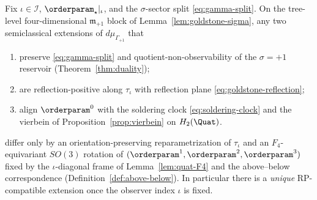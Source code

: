\begin{lemma}
\label{lem:goldstone-rp-unique}
Fix $\iota\in\mathcal{I}$, $\orderparam_\star|_\iota$, and the
$\sigma$-sector split \eqref{eq:gamma-split}. On the tree-level
four-dimensional $\mathfrak{m}_{+1}$ block of
Lemma~\ref{lem:goldstone-sigma}, any two semiclassical extensions of
$d\mu_{\Gamma_{+1}}$ that
\begin{enumerate}[label=(\roman*),leftmargin=*]
  \item preserve \eqref{eq:gamma-split} and quotient-non-observability of
    the $\sigma=+1$ reservoir (Theorem~\ref{thm:duality});
  \item are reflection-positive along $\tau_\iota$ with reflection plane
    \eqref{eq:goldstone-reflection};
  \item align $\orderparam^0$ with the soldering clock
    \eqref{eq:soldering-clock} and the vierbein of
    Proposition~\ref{prop:vierbein} on $H_2(\Quat)$.
\end{enumerate}
differ only by an orientation-preserving reparametrization of
$\tau_\iota$ and an $F_4$-equivariant $SO(3)$ rotation of
$(\orderparam^1,\orderparam^2,\orderparam^3)$ fixed by the
$\iota$-diagonal frame of Lemma~\ref{lem:quat-F4} and the above--below
correspondence (Definition~\ref{def:above-below}). In particular there is a
\emph{unique} RP-compatible extension once the observer index $\iota$ is fixed.
\end{lemma}

